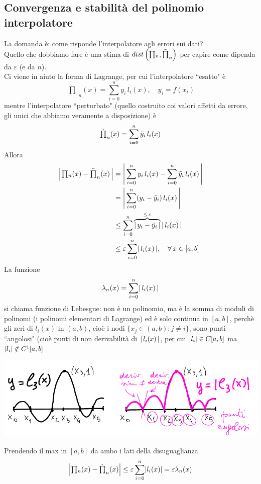 \documentclass[12pt]{article}
\DeclarePairedDelimiter{\abs}{\lvert}{\rvert}
\newcommand{\inter}{\begin{matrix}\prod\end{matrix}}
\begin{document}
\subsection{Convergenza e stabilità del polinomio interpolatore}
La domanda è: come risponde l'interpolatore agli errori sui dati?\\
Quello che dobbiamo fare è una stima di $dist \left(\inter_n, \Tilde{\inter}_n \right)$ per capire come dipenda da $\varepsilon$ (e da $n$).\\
Ci viene in aiuto la forma di Lagrange, per cui l'interpolatore ``esatto" è
\[\inter_n(x) = \sum_{i=0}^n y_i \, l_i(x), \quad y_i = f(x_i)\]
mentre l'interpolatore ``perturbato" (quello costruito coi valori affetti da errore, gli unici che abbiamo veramente a disposizione) è
\[\Tilde{\inter}_n(x) = \sum_{i=0}^n \Tilde{y}_i \, l_i(x)\]
Allora
\[\begin{split}
    \abs*{\,\inter_n(x) - \Tilde{\inter}_n(x)\,} & = \abs*{\,\sum_{i=0}^n y_i \, l_i(x) - \sum_{i=0}^n \Tilde{y}_i \, l_i(x)\,} \\
    & = \abs*{\,\sum_{i=0}^n (y_i - \Tilde{y}_i)\, l_i(x) \,} \\
    & \le \sum_{i=0}^n \overbrace{\abs*{\,y_i - \tilde{y}_i\,}}^{\le\, \varepsilon}\, \abs{\,l_i(x)\,} \\
    & \le \varepsilon \sum_{i=0}^n \abs{\,l_i(x)\,}, \quad \forall\, x \in [a,b]
\end{split}\]
La funzione 
\[\lambda_n(x) = \sum_{i=0}^n \abs*{\,l_i(x)\,}\]
si chiama funzione di Lebesgue: non è un polinomio, ma è la somma di moduli di polinomi (i polinomi elementari di Lagrange) ed è solo continua in $[a,b]$, perchè gli zeri di $l_i(x)$ in $(a,b)$, cioè i nodi $\{x_j \in (a,b) : j \ne i\}$, sono punti ``angolosi" (cioè punti di non derivabilità di $\abs{\,l_i(x)\,}$, per cui $\abs{l_i}\in C[a,b]$ ma $\abs{l_i} \notin C^1[a,b]$
\begin{center}
    \includegraphics[scale=0.8]{lez13_img2.png}
\end{center}
Prendendo il max in $[a,b]$ da ambo i lati della disuguaglianza 
\[ \abs*{\inter_n(x)-\tilde{\inter}_n(x)}\leq \varepsilon  \sum_{i=0}^n \abs{l_i(x)}=\varepsilon\lambda_n(x) \]
\end{document}

